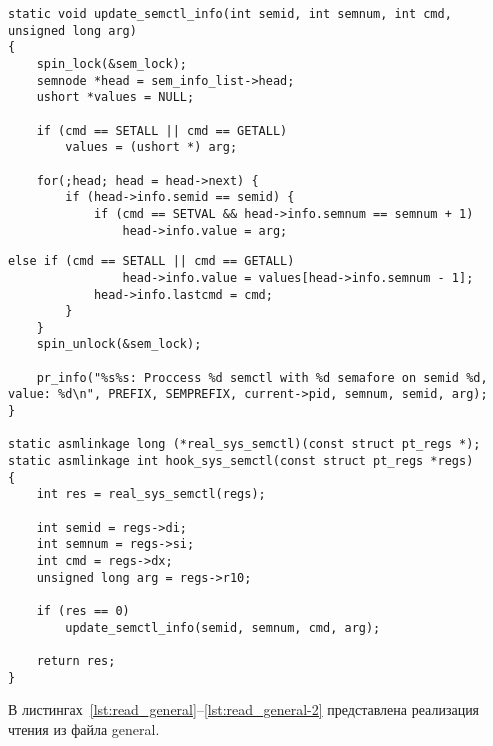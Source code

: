 \begin{lstlisting}[label=lst:sys_semctl,caption=Реализация функции обертки \texttt{sys\_semctl()}]	
static void update_semctl_info(int semid, int semnum, int cmd, unsigned long arg)
{
	spin_lock(&sem_lock);	
	semnode *head = sem_info_list->head;
	ushort *values = NULL;
	
	if (cmd == SETALL || cmd == GETALL)
		values = (ushort *) arg;

	for(;head; head = head->next) {
		if (head->info.semid == semid) {
			if (cmd == SETVAL && head->info.semnum == semnum + 1)
				head->info.value = arg;
\end{lstlisting}				
\begin{lstlisting}[label=lst:sys_semctl-2,caption=Реализация функции обертки \texttt{sys\_semctl()}]				
			else if (cmd == SETALL || cmd == GETALL)
				head->info.value = values[head->info.semnum - 1];	
			head->info.lastcmd = cmd;
		} 
	}
	spin_unlock(&sem_lock);
	
	pr_info("%s%s: Proccess %d semctl with %d semafore on semid %d, value: %d\n", PREFIX, SEMPREFIX, current->pid, semnum, semid, arg);
}

static asmlinkage long (*real_sys_semctl)(const struct pt_regs *);
static asmlinkage int hook_sys_semctl(const struct pt_regs *regs)
{
	int res = real_sys_semctl(regs);
	
	int semid = regs->di;
	int semnum = regs->si;
	int cmd = regs->dx;
	unsigned long arg = regs->r10;
	
	if (res == 0)
		update_semctl_info(semid, semnum, cmd, arg);
	
	return res;
}
\end{lstlisting}

\clearpage

В листингах~\ref{lst:read_general}--\ref{lst:read_general-2} представлена реализация чтения из файла general.

